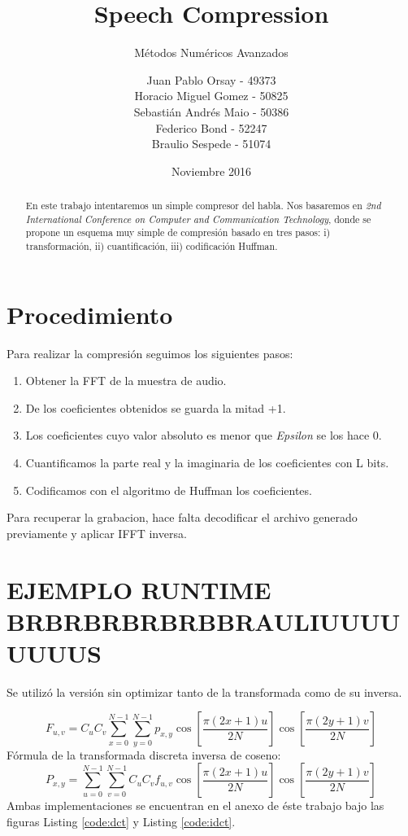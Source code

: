 \documentclass[spanish]{scrartcl}
\subtitle{Métodos Numéricos Avanzados}
\title{Speech Compression}
\author{
Juan Pablo Orsay - 49373 \\
Horacio Miguel Gomez - 50825 \\
Sebastián Andrés Maio - 50386 \\
Federico Bond - 52247 \\
Braulio Sespede - 51074
}
\date{Noviembre 2016}
\let\endtitlepage\relax
\begin{document}
\maketitle
\endtitlepage

\begin{abstract}
En este trabajo intentaremos un simple compresor del habla. Nos basaremos en \textit{2nd International Conference on Computer and Communication Technology}, donde se propone un esquema muy simple de compresión basado en tres pasos: i) transformación, ii) cuantificación, iii) codificación Huffman.
\end{abstract}
\break
\tableofcontents
\break
\section{Procedimiento}
Para realizar la compresión seguimos los siguientes pasos:
\begin{enumerate}
\item Obtener la FFT de la muestra de audio.
\item De los coeficientes obtenidos se guarda la mitad +1.
\item Los coeficientes cuyo valor absoluto es menor que \textit{Epsilon} se los hace 0.
\item Cuantificamos la parte real y la imaginaria de los coeficientes con L bits.
\item Codificamos con el algoritmo de Huffman los coeficientes.
\end{enumerate}
Para recuperar la grabacion, hace falta decodificar el archivo generado previamente y aplicar IFFT inversa.
\section{EJEMPLO RUNTIME BRBRBRBRBRBBRAULIUUUUUUUUS}
Se utilizó la versión sin optimizar tanto de la transformada como de su inversa.

\begin{equation}
\label{eq:dct}
F_{u,v} =
 C_{u} C_{v} \sum_{x=0}^{N-1}
 \sum_{y=0}^{N-1}
 p_{x,y}
\cos \left[\frac{\pi \left(2 x + 1\right) u}{2 N} \right]
\cos \left[\frac{\pi \left(2 y + 1\right) v}{2 N} \right]
\end{equation}
Fórmula de la transformada discreta inversa de coseno\cite{mathworks_DCT}:
\begin{equation}
\label{eq:idct}
P_{x,y} =
 \sum_{u=0}^{N-1}
 \sum_{v=0}^{N-1}
 C_{u} C_{v}
 f_{u,v}
\cos \left[\frac{\pi \left(2 x + 1\right) u}{2 N} \right]
\cos \left[\frac{\pi \left(2 y + 1\right) v}{2 N} \right]
\end{equation}
Ambas implementaciones se encuentran en el anexo de éste trabajo bajo las figuras Listing \ref{code:dct} y Listing \ref{code:idct}.
\end{document}

